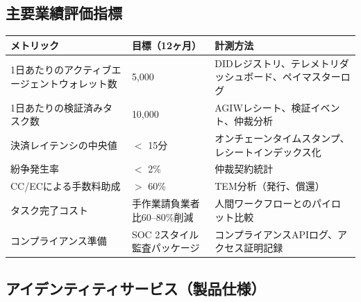 \documentclass[11pt]{article}
\begin{document}
\subsection{主要業績評価指標}
\begin{longtable}{@{}p{}p{}p{}@{}}
\toprule
\textbf{メトリック} & \textbf{目標（12ヶ月）} & \textbf{計測方法} \\\midrule
1日あたりのアクティブエージェントウォレット数 & 5,000 & DIDレジストリ、テレメトリダッシュボード、ペイマスターログ \\
1日あたりの検証済みタスク数 & 10,000 & AGIWレシート、検証イベント、仲裁分析 \\
決済レイテンシの中央値 & $<$ 15分 & オンチェーンタイムスタンプ、レシートインデックス化 \\
紛争発生率 & $<$ 2\% & 仲裁契約統計 \\
CC/ECによる手数料助成 & $>$ 60\% & TEM分析（発行、償還） \\
タスク完了コスト & 手作業請負業者比60--80\%削減 & 人間ワークフローとのパイロット比較 \\
コンプライアンス準備 & SOC 2スタイル監査パッケージ & コンプライアンスAPIログ、アクセス証明記録 \\
\bottomrule
\end{longtable}

\subsection{アイデンティティサービス（製品仕様）}
\label{sec:identity-spec}
\end{document}
